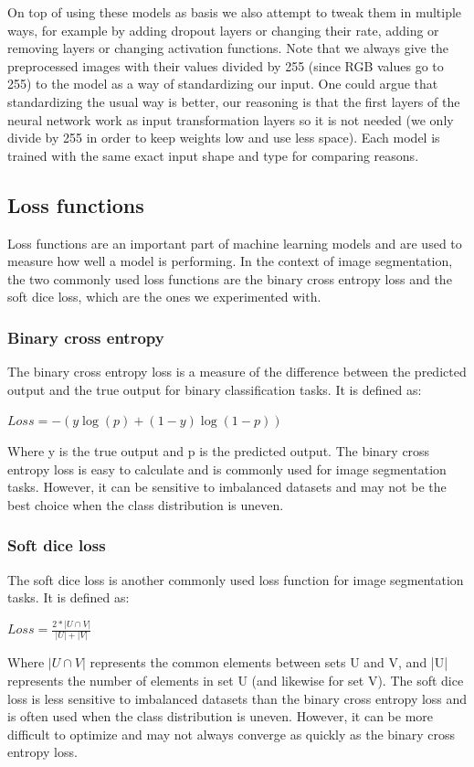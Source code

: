 \documentclass[10pt,conference,compsocconf]{IEEEtran}
\begin{document}
On top of using these models as basis we also attempt to tweak them in multiple ways, for example by adding dropout layers or changing their rate, adding or removing layers or changing activation functions.
Note that we always give the preprocessed images with their values divided by 255 (since RGB values go to 255) to the model as a way of standardizing our input. One could argue that standardizing the usual way is better, our reasoning is that the first layers of the neural network work as input transformation layers so it is not needed (we only divide by 255 in order to keep weights low and use less space). Each model is trained with the same exact input shape and type for comparing reasons.

\subsection{Loss functions}
Loss functions are an important part of machine learning models and are used to measure how well a model is performing. In the context of image segmentation, the two commonly used loss functions are the binary cross entropy loss and the soft dice loss, which are the ones we experimented with.
\subsubsection{Binary cross entropy}
The binary cross entropy loss is a measure of the difference between the predicted output and the true output for binary classification tasks. It is defined as:
\begin{center}
$Loss = -{(y\log(p) + (1 - y)\log(1 - p))}$
\end{center}

Where y is the true output and p is the predicted output. The binary cross entropy loss is easy to calculate and is commonly used for image segmentation tasks. However, it can be sensitive to imbalanced datasets and may not be the best choice when the class distribution is uneven.
\subsubsection{Soft dice loss}
The soft dice loss is another commonly used loss function for image segmentation tasks. It is defined as:
\begin{center}
$Loss = \frac{2*|U \cap V|}{|U| + |V|}$
\end{center}
Where ${|U \cap V|}$ represents the common elements between sets U and V, and |U| represents the number of elements in set U (and likewise for set V). The soft dice loss is less sensitive to imbalanced datasets than the binary cross entropy loss and is often used when the class distribution is uneven. However, it can be more difficult to optimize and may not always converge as quickly as the binary cross entropy loss.
\end{document}
